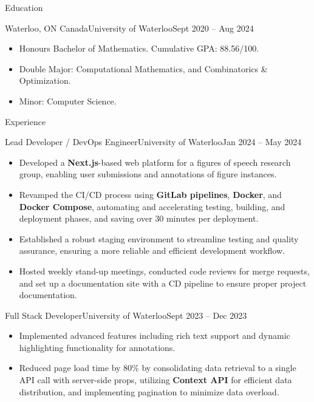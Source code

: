 \documentclass[]{mcdowellcv}
\begin{document}
	\makeheader
	\begin{cvsection}{Education}
		\begin{cvsubsection}{Waterloo, ON Canada}{University of Waterloo}{Sept 2020 -- Aug 2024}
			\begin{itemize}
				\item Honours Bachelor of Mathematics. Cumulative GPA: 88.56/100.
				\item Double Major: Computational Mathematics, and Combinatorics \& Optimization.
				\item Minor: Computer Science.
			\end{itemize}
		\end{cvsubsection}
	\end{cvsection}
	\begin{cvsection}{Experience}
		\begin{cvsubsection}{Lead Developer / DevOps Engineer}{University of Waterloo}{Jan 2024 -- May 2024}	
			\begin{itemize}
				\item Developed a \textbf{Next.js}-based web platform for a figures of speech research group, enabling user submissions and annotations of figure instances.
				\item Revamped the CI/CD process using \textbf{GitLab pipelines}, \textbf{Docker}, and \textbf{Docker Compose}, automating and accelerating testing, building, and deployment phases, and saving over 30 minutes per deployment.
				\item Established a robust staging environment to streamline testing and quality assurance, ensuring a more reliable and efficient development workflow.
				\item Hosted weekly stand-up meetings, conducted code reviews for merge requests, and set up a documentation site with a CD pipeline to ensure proper project documentation.
			\end{itemize}	
		\end{cvsubsection}
		\begin{cvsubsection}{Full Stack Developer}{University of Waterloo}{Sept 2023 -- Dec 2023}
			\begin{itemize}
				\item Implemented advanced features including rich text support and dynamic highlighting functionality for annotations.
				\item Reduced page load time by 80\% by consolidating data retrieval to a single API call with server-side props, utilizing \textbf{Context API} for efficient data distribution, and implementing pagination to minimize data overload.

\end{itemize}
\end{cvsubsection}
\end{cvsection}
\end{document}
